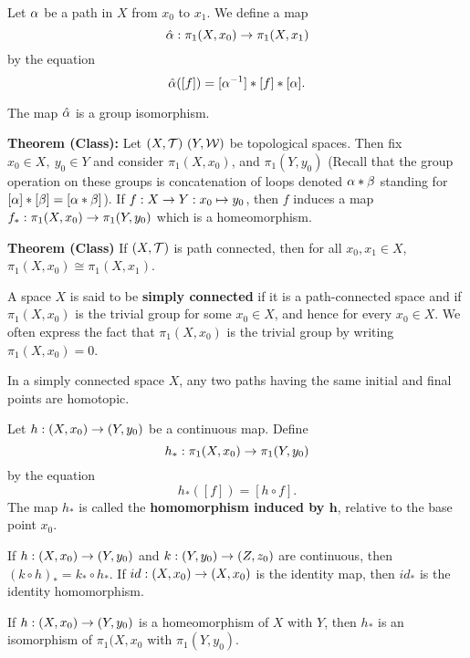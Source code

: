 \dfn Let $\alpha$ be a path in $X$ from $x_0$ to $x_1$. We define a map
\[\hat {\alpha} :\pi_1(X, x_0)\rightarrow \pi_1(X, x_1)\]
by the equation
\[\hat {\alpha}([f]) = [\alpha^{-1}]*[f]*[\alpha].\]

\vs

\begin{thm}
The map $\hat {\alpha}$ is a group isomorphism.
\end{thm}

\vs

\textbf{Theorem (Class):} Let $(X, \mathcal{T})\ (Y, \mathcal{W})$ be topological spaces. Then fix $x_0\in X,\ y_0\in Y$ and consider $\pi_1(X, x_0)$, and $\pi_1(Y, y_0)$ (Recall that the group operation on these groups is concatenation of loops denoted $\alpha * \beta$  standing for $[\alpha]*[\beta] = [\alpha*\beta]$). If $f:X\rightarrow Y:x_0 \mapsto y_0$, then $f$ induces a map $f_*:\pi_1(X,x_0) \rightarrow \pi_1(Y,y_0)$ which is a homeomorphism.

\vs

\textbf{Theorem (Class)} If $(X, \mathcal{T})$ is path connected, then for all $x_0, x_1\in X$, $\pi_1(X, x_0)\cong \pi_1(X, x_1)$.

\vs

\dfn A space $X$ is said to be \textbf{simply connected} if it is a path-connected space and if $\pi_1(X, x_0)$ is the trivial group for some $x_0\in X$, and hence for every $x_0\in X$. We often express the fact that $\pi_1(X, x_0)$ is the trivial group by writing $\pi_1(X, x_0) = 0$.

\vs

\begin{lem}
In a simply connected space $X$, any two paths having the same initial and final points are homotopic.
\end{lem}

\vs

\dfn Let $h:(X, x_0) \rightarrow (Y, y_0)$ be a continuous map. Define
\[h_*:\pi_1(X, x_0)\rightarrow \pi_1(Y, y_0)\]
by the equation
\[h_*([f]) = [h\circ f].\]
The map $h_*$ is called the \textbf{homomorphism induced by $\boldsymbol{h}$}, relative to the base point $x_0$.

\vs

\begin{thm}
If $h:(X, x_0)\rightarrow (Y, y_0)$ and $k:(Y, y_0)\rightarrow (Z, z_0)$ are continuous, then $(k\circ h)_* = k_*\circ h_*$. If $id:(X, x_0)\rightarrow (X, x_0)$ is the identity map, then $id_*$ is the identity homomorphism.
\end{thm}

\vs

\begin{cor}
If $h:(X, x_0)\rightarrow (Y, y_0)$ is a homeomorphism of $X$ with $Y$, then $h_*$ is an isomorphism of $\pi_1(X, x_0$ with $\pi_1(Y, y_0)$.
\end{cor}



